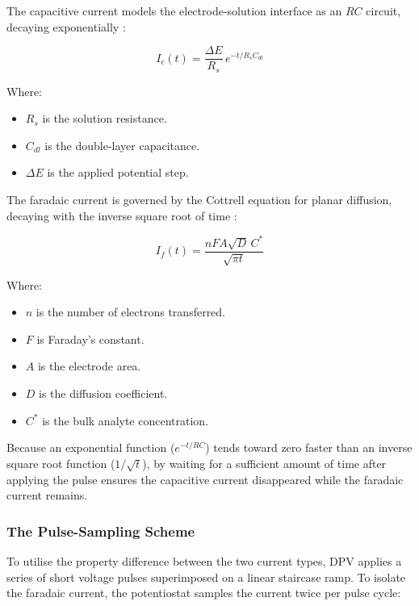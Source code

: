 The capacitive current models the electrode-solution interface as an $RC$ circuit, decaying exponentially \cite{palmsens_capacitive_current}:

\begin{equation}
I_c(t) = \frac{\Delta E}{R_s} \, e^{-t/R_sC_{dl}}
\end{equation}

Where: 
\begin{itemize}[label=\textbullet]

\item $R_s$ is the solution resistance.
\item $C_{dl}$ is the double-layer capacitance.
\item $\Delta E$ is the applied potential step.

\end{itemize}

The faradaic current is governed by the Cottrell equation for planar diffusion, decaying with the inverse square root of time \cite{bard2001}:

\begin{equation}
I_f(t) = \frac{nFA\sqrt{D}\,C^*}{\sqrt{\pi t}}
\end{equation}

Where: 

\begin{itemize}[label=\textbullet]
    \item $n$ is the number of electrons transferred.
    \item $F$ is Faraday's constant.
    \item $A$ is the electrode area.
    \item $D$ is the diffusion coefficient.
    \item $C^*$ is the bulk analyte concentration.
\end{itemize}

Because an exponential function ($e^{-t/RC}$) tends toward zero faster than an inverse square root function ($1/\sqrt{t}$), by waiting for a sufficient amount of time after applying the pulse ensures the capacitive current disappeared while the faradaic current remains. 
\subsubsection{The Pulse-Sampling Scheme}

To utilise the property difference between the two current types, DPV applies a series of short voltage pulses superimposed on a linear staircase ramp. To isolate the faradaic current, the potentiostat samples the current twice per pulse cycle:

